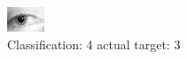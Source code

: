 \begin{figure}[h!]
\begin{center}
\includegraphics[width=0.60\columnwidth]{figures/ID1345_class_4_target_3.png}
\end{center}
\caption{ Classification: 4 actual target: 3}
\label{fig:ID1345_class_4_target_3}
\end{figure}
